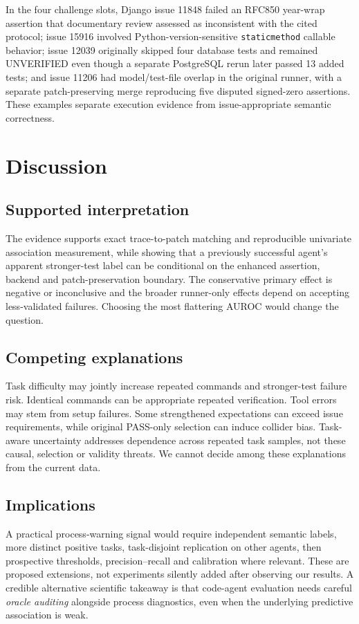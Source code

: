 \documentclass[journal]{IEEEtran}
\begin{document}
In the four challenge slots, Django issue 11848 failed an RFC850 year-wrap assertion that documentary review assessed as inconsistent with the cited protocol; issue 15916 involved Python-version-sensitive \texttt{staticmethod} callable behavior; issue 12039 originally skipped four database tests and remained UNVERIFIED even though a separate PostgreSQL rerun later passed 13 added tests; and issue 11206 had model/test-file overlap in the original runner, with a separate patch-preserving merge reproducing five disputed signed-zero assertions. These examples separate execution evidence from issue-appropriate semantic correctness.

\section{Discussion}
\subsection{Supported interpretation}
The evidence supports exact trace-to-patch matching and reproducible univariate association measurement, while showing that a previously successful agent's apparent stronger-test label can be conditional on the enhanced assertion, backend and patch-preservation boundary. The conservative primary effect is negative or inconclusive and the broader runner-only effects depend on accepting less-validated failures. Choosing the most flattering AUROC would change the question.

\subsection{Competing explanations}
Task difficulty may jointly increase repeated commands and stronger-test failure risk. Identical commands can be appropriate repeated verification. Tool errors may stem from setup failures. Some strengthened expectations can exceed issue requirements, while original PASS-only selection can induce collider bias. Task-aware uncertainty addresses dependence across repeated task samples, not these causal, selection or validity threats. We cannot decide among these explanations from the current data.

\subsection{Implications}
A practical process-warning signal would require independent semantic labels, more distinct positive tasks, task-disjoint replication on other agents, then prospective thresholds, precision--recall and calibration where relevant. These are proposed extensions, not experiments silently added after observing our results. A credible alternative scientific takeaway is that code-agent evaluation needs careful \emph{oracle auditing} alongside process diagnostics, even when the underlying predictive association is weak.
\end{document}
